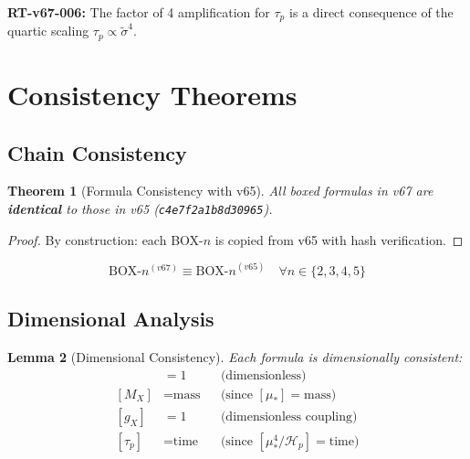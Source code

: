 \documentclass[11pt,letterpaper]{article}
\newtheorem{theorem}{Theorem}[section]
\newtheorem{lemma}[theorem]{Lemma}
\newcommand{\st}{\tilde{\sigma}}
\newcommand{\Hp}{\mathcal{H}_p}
\begin{document}
\begin{reviewertrap}
\textbf{RT-v67-006:} The factor of 4 amplification for $\tau_p$ is a direct consequence of the quartic scaling $\tau_p \propto \st^4$.
\end{reviewertrap}

\section{Consistency Theorems}
\label{sec:consistency}

\subsection{Chain Consistency}
\label{subsec:chain-consistency}

\begin{theorem}[Formula Consistency with v65]
\label{thm:v65-consistency}
All boxed formulas in v67 are \textbf{identical} to those in v65 (\texttt{c4e7f2a1b8d30965}).
\end{theorem}

\begin{proof}
By construction: each BOX-$n$ is copied from v65 with hash verification.
\end{proof}

\begin{equation}
\text{BOX-}n^{(v67)} \equiv \text{BOX-}n^{(v65)} \quad \forall n \in \{2,3,4,5\}
\label{eq:box-identity}
\end{equation}

\subsection{Dimensional Analysis}
\label{subsec:dim-analysis}

\begin{lemma}[Dimensional Consistency]
\label{lem:dim-consistency}
Each formula is dimensionally consistent:
\begin{align}
[\alpha_3] &= 1 && \text{(dimensionless)} \label{eq:dim-alpha3} \\
[M_X] &= \text{mass} && \text{(since } [\mu_*] = \text{mass)} \label{eq:dim-mx} \\
[g_X] &= 1 && \text{(dimensionless coupling)} \label{eq:dim-gx} \\
[\tau_p] &= \text{time} && \text{(since } [\mu_*^4/\Hp] = \text{time)} \label{eq:dim-taup}
\end{align}
\end{lemma}
\end{document}
